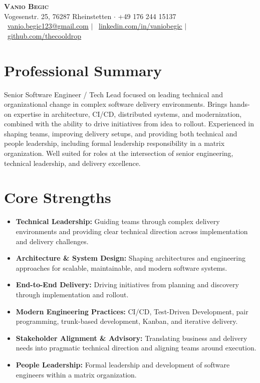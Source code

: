 \documentclass[a4paper,12pt]{article}
\newcommand{\resumeItem}[1]{
	\item\small{
		{#1 \vspace{-2pt}}
	}
}
\newcommand{\resumeItemListStart}{\begin{itemize}}
\newcommand{\resumeItemListEnd}{\end{itemize}\vspace{-5pt}}
\begin{document}
	
	\begin{center}
		\textbf{\Huge \scshape Vanio Begic} \\ \vspace{2pt} 
		Vogesenstr. 25, 76287 Rheinstetten $\cdot$ \small +49 176 244 15137 \\ \vspace{2pt}
		\faEnvelope \ \href{mailto:vanio.begic123@gmail.com.com}{\underline{vanio.begic123@gmail.com}} $|$ 
		\faLinkedin \ \href{https://linkedin.com/in/vaniobegic}{\underline{linkedin.com/in/vaniobegic}} $|$
		\faGithub \ \href{https://github.com/thecooldrop}{\underline{github.com/thecooldrop}}
	\end{center}
	

\section{Professional Summary}
Senior Software Engineer / Tech Lead focused on leading technical and organizational change in complex software delivery environments. Brings hands-on expertise in architecture, CI/CD, distributed systems, and modernization, combined with the ability to drive initiatives from idea to rollout. Experienced in shaping teams, improving delivery setups, and providing both technical and people leadership, including formal leadership responsibility in a matrix organization. Well suited for roles at the intersection of senior engineering, technical leadership, and delivery excellence.

\section{Core Strengths}
\resumeItemListStart
\resumeItem{\textbf{Technical Leadership:} Guiding teams through complex delivery environments and providing clear technical direction across implementation and delivery challenges.}
\resumeItem{\textbf{Architecture \& System Design:} Shaping architectures and engineering approaches for scalable, maintainable, and modern software systems.}
\resumeItem{\textbf{End-to-End Delivery:} Driving initiatives from planning and discovery through implementation and rollout.}
\resumeItem{\textbf{Modern Engineering Practices:} CI/CD, Test-Driven Development, pair programming, trunk-based development, Kanban, and iterative delivery.}
\resumeItem{\textbf{Stakeholder Alignment \& Advisory:} Translating business and delivery needs into pragmatic technical direction and aligning teams around execution.}
\resumeItem{\textbf{People Leadership:} Formal leadership and development of software engineers within a matrix organization.}
\resumeItemListEnd
\end{document}
